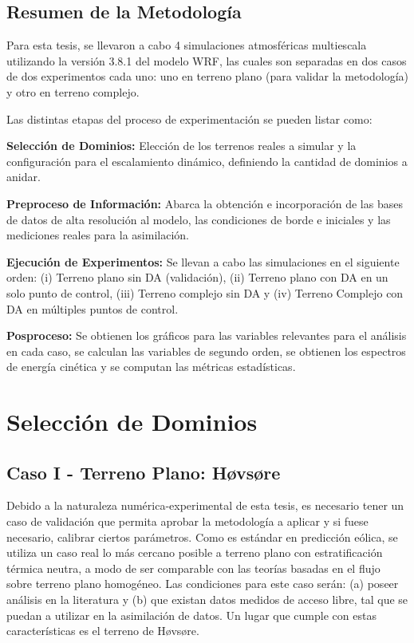 \subsection{Resumen de la Metodología}
Para esta tesis, se llevaron a cabo 4 simulaciones atmosféricas multiescala utilizando la versión 3.8.1 del modelo WRF, las cuales son separadas en dos casos de dos experimentos cada uno: uno en terreno plano (para validar la metodología) y otro en terreno complejo.

Las distintas etapas del proceso de experimentación se pueden listar como:
\begin{enumerate*}
	\item \textbf{Selección de Dominios: } Elección de los terrenos reales a simular y la configuración para el escalamiento dinámico, definiendo la cantidad de dominios a anidar.
	\item \textbf{Preproceso de Información:} Abarca la obtención e incorporación de las bases de datos de alta resolución al modelo, las condiciones de borde e iniciales y las mediciones reales para la asimilación.
	\item \textbf{Ejecución de Experimentos:} Se llevan a cabo las simulaciones en el siguiente orden: (i) Terreno plano sin DA (validación), (ii) Terreno plano con DA en un solo punto de control, (iii) Terreno complejo sin DA y (iv) Terreno Complejo con DA en múltiples puntos de control.
	\item \textbf{Posproceso:} Se obtienen los gráficos para las variables relevantes para el análisis en cada caso, se calculan las variables de segundo orden, se obtienen los espectros de energía cinética y se computan las métricas estadísticas.
\end{enumerate*}
\newpage
\section{Selección de Dominios}
\subsection{Caso I - Terreno Plano: Høvsøre}
 Debido a la naturaleza numérica-experimental de esta tesis, es necesario tener un caso de validación que permita aprobar la metodología a aplicar y si fuese necesario, calibrar ciertos parámetros. Como es estándar en predicción eólica, se utiliza un caso real lo más cercano posible a terreno plano con estratificación térmica neutra, a modo de ser comparable con las teorías basadas en el flujo sobre terreno plano homogéneo. Las condiciones para este caso serán: (a) poseer análisis en la literatura y (b) que existan datos medidos de acceso libre, tal que se puedan a utilizar en la asimilación de datos. Un lugar que cumple con estas características es el terreno de Høvsøre.


